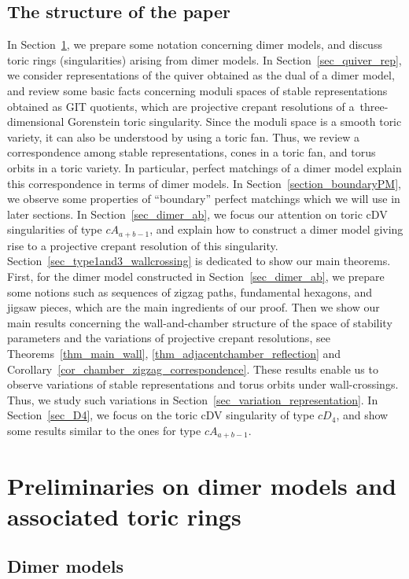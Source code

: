 \documentclass[pdftex]{sigma}
\numberwithin{equation}{section}
\theoremstyle{definition}
\begin{document}
\subsection{The structure of the paper}
In Section~\ref{sec_pre_dimer}, we prepare some notation concerning dimer models,
and discuss toric rings (singularities) arising from dimer models.
In Section~\ref{sec_quiver_rep}, we consider representations of the quiver obtained as the dual of a dimer model,
and review some basic facts concerning moduli spaces of stable representations obtained as GIT quotients,
which are projective crepant resolutions of a~three-dimensional Gorenstein toric singularity.
Since the moduli space is a smooth toric variety, it can also be understood by using a toric fan.
Thus, we review a correspondence among stable representations, cones in a toric fan, and torus orbits in a toric variety.
In particular, perfect matchings of a dimer model explain this correspondence in terms of dimer models.
In Section~\ref{section_boundaryPM}, we observe some properties of ``boundary'' perfect matchings which we will use in later sections.
In Section~\ref{sec_dimer_ab}, we focus our attention on toric cDV singularities of type $cA_{a+b-1}$,
and explain how to construct a dimer model giving rise to a projective crepant resolution of this singularity.
Section~\ref{sec_type1and3_wallcrossing} is dedicated to show our main theorems.
First, for the dimer model constructed in Section~\ref{sec_dimer_ab}, we prepare some notions such as
sequences of zigzag paths, fundamental hexagons, and jigsaw pieces, which are the main ingredients of our proof.
Then we show our main results concerning the wall-and-chamber structure of the space of stability parameters and
the variations of projective crepant resolutions,
see Theorems~\ref{thm_main_wall}, \ref{thm_adjacentchamber_reflection} and Corollary~\ref{cor_chamber_zigzag_correspondence}.
These results enable us to observe variations of stable representations and torus orbits under wall-crossings.
Thus, we study such variations in Section~\ref{sec_variation_representation}.
In Section~\ref{sec_D4}, we focus on the toric cDV singularity of type $cD_4$,
and show some results similar to the ones for type $cA_{a+b-1}$.

\section{Preliminaries on dimer models and associated toric rings}\label{sec_pre_dimer}

\subsection{Dimer models}\label{subsec_dimermodel}
\end{document}
